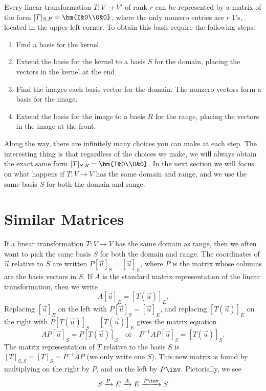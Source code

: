 Every linear transformation $T\colon V\to V'$ of rank $r$ can be represented by a matrix of the form $[T]_{S,R}=\bm{I&0\\0&0}$, where the only nonzero entries are $r$ 1's, located in the upper left corner. To obtain this basis require the following steps: 
\begin{enumerate}
	\item Find a basis for the kernel.
	\item Extend the basis for the kernel to a basis $S$ for the domain, placing the vectors in the kernel at the end.
	\item Find the images each basis vector for the domain. The nonzero vectors form a basis for the image.
	\item Extend the basis for the image to a basis $R$ for the range, placing the vectors in the image at the front.  
\end{enumerate}
Along the way, there are infinitely many choices you can make at each step.  The interesting thing is that regardless of the choices we make, we will always obtain the exact same form $[T]_{S,R}=\bm{I&0\\0&0}$. In the next section we will focus on what happens if $T\colon V\to V$ has the same domain and range, and we use the same basis $S$ for both the domain and range. 




\section{Similar Matrices}

If a linear transformation $T\colon V\to V$ has the same domain as range, then we often want to pick the same basis $S$ for both the domain and range.  The coordinates of $\vec u$ relative to $S$ are written $P[\vec u]_S = [\vec u]_E$, where $P$ is the matrix whose columns are the basis vectors in $S$.  If $A$ is the standard matrix representation of the linear transformation, then we write
$$A[\vec u]_E = [T(\vec u)]_E.$$  Replacing $[\vec u]_E$ on the left with $P[\vec u]_S = [\vec u]_E$, and replacing $[T(\vec u)]_E$ on the right with $P[T(\vec u)]_S = [T(\vec u)]_E$ gives the matrix equation $$AP[\vec u]_S = P[T(\vec u)]_S\quad \text{or}\quad P^{-1}AP [\vec u]_S = [T(\vec u)]_S.$$ The matrix representation of $T$ relative to the basis $S$ is $[T]_{S,S}=[T]_S = P^{-1}AP$ (we only write one $S$). This new matrix is found by multiplying on the right by $P$, and on the left by $P\inv$.  Pictorially, we see
\begin{equation*}
  S\xrightarrow{P}E\xrightarrow{A}E\xrightarrow{P\inv}S
\end{equation*}


